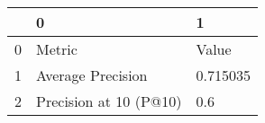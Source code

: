 \begin{tabular}{lll}
\toprule
{} &                       0 &         1 \\
\midrule
0 &                  Metric &     Value \\
1 &       Average Precision &  0.715035 \\
2 &  Precision at 10 (P@10) &       0.6 \\
\bottomrule
\end{tabular}
